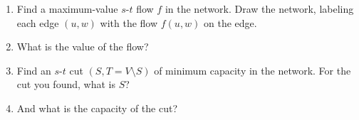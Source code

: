 \documentclass[11pt]{article}
\begin{document}
\begin{enumerate}[label=(\alph*)]

\item 
  Find a maximum-value $s$-$t$ flow $f$ in the network.
  Draw the network, labeling each edge $(u, w)$ with the flow $f(u,w)$ on the edge.

\item
  What is the value of the flow? 

\item
  Find an $s$-$t$ cut $(S, T=V\setminus S)$ of minimum capacity in the network.
  For the cut you found, what is $S$?

\item
  And what is the capacity of the cut?

\end{enumerate}

\vfill

\setlength{\ITEMHT}{1in}
{\injectEnumerate
}
\end{document}
